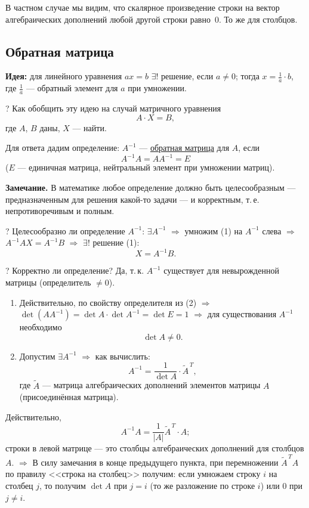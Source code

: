 \documentclass[a4paper, 12pt]{article}
\begin{document}
В частном случае мы видим, что скалярное произведение строки на вектор
алгебраических дополнений любой другой строки равно~0. То же для столбцов.

\subsection{Обратная матрица}

\textbf{Идея:} для линейного уравнения $ax = b$ $\exists!$ решение, если
$a \ne 0$; тогда $x = \frac{1}{a} \cdot b$, где $\frac1a$ --- обратный элемент
для $a$ при умножении.

? Как обобщить эту идею на случай матричного уравнения
\[
  A \cdot X = B, \tag{1}
\]
где $A$, $B$ даны, $X$ --- найти.

Для ответа дадим определение: $A^{-1}$ --- \underline{обратная матрица}
для $A$, если
\[
  \boxed{A^{-1} A = A A^{-1} = E} \tag{2}
\]
($E$ --- единичная матрица, нейтральный элемент при умножении матриц).

\textbf{Замечание.} В математике любое определение должно быть
целесообразным --- предназначенным для решения какой-то задачи --- и
корректным, т.\,е. непротиворечивым и полным. %

? Целесообразно ли определение $A^{-1}$: $\exists A^{-1}$ $\Rightarrow$
умножим (1) на $A^{-1}$ слева $\Rightarrow$ $A^{-1} A X = A^{-1} B$
$\Rightarrow$ $\exists!$ решение (1):
\[
  X = A^{-1} B. \tag{3}
\]

? Корректно ли определение? Да, т.\,к. $A^{-1}$ существует для невырожденной
матрицы (определитель $\ne 0$).

\begin{enumerate}[label=\arabic*)]
  \item Действительно, по свойству определителя из (2) $\Rightarrow$
    $\det(A A^{-1}) = \det A \cdot \det A^{-1} = \det E = 1$
    $\Rightarrow$ для существования $A^{-1}$ необходимо
    \[
      \det A \ne 0. \tag{4}
    \]
  \item Допустим $\exists A^{-1}$ $\Rightarrow$ как вычислить:
    \[
      A^{-1} = \frac{1}{\det A} \cdot \widetilde{A}^{\,T}, \tag{5}
    \]
    где $\widetilde{A}$ --- матрица алгебраических дополнений элементов
    матрицы $A$ (присоединённая матрица).
\end{enumerate}

Действительно,
\[
  A^{-1} A = \frac{1}{|A|} \widetilde{A}^{\,T} \cdot A;
\]
строки в левой матрице --- это столбцы алгебраических дополнений для
столбцов $A$.
$\Rightarrow$ В силу замечания в конце предыдущего пункта, при перемножении
$\widetilde{A}^{\,T} A$ по правилу <<строка на столбец>> получим: если
умножаем строку $i$ на столбец $j$, то получим $\det A$ при $j = i$ (то же
разложение по строке $i$) или 0 при $j \ne i$.
\end{document}
